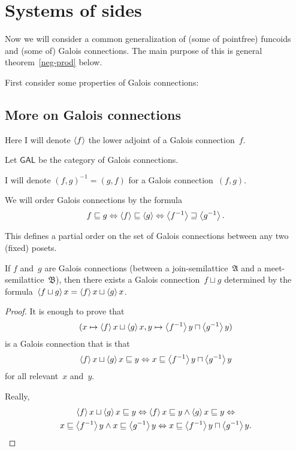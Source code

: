 \chapter{Systems of sides}

Now we will consider a common generalization of (some of pointfree) funcoids and (some of) Galois connections.
The main purpose of this is general theorem~\ref{neg-prod} below.

First consider some properties of Galois connections:

\section{More on Galois connections}

Here I will denote $\left\langle f\right\rangle$ the lower adjoint of a Galois connection~$f$. 

Let $\mathsf{GAL}$ be the category of Galois connections.

I will denote $(f,g)^{-1}=(g,f)$ for a Galois connection~$(f,g)$.

We will order Galois connections by the formula
\[ f\sqsubseteq g \Leftrightarrow \left\langle f\right\rangle\sqsubseteq\left\langle g\right\rangle \Leftrightarrow \left\langle f^{-1}\right\rangle\sqsupseteq\left\langle g^{-1}\right\rangle. \]

\begin{obvious}
This defines a partial order on the set of Galois connections between any two (fixed) posets.
\end{obvious}

\begin{prop}\label{gal-fjoin-x}
If $f$ and~$g$ are Galois connections (between a join-semilattice~$\mathfrak{A}$ and a meet-semilattice~$\mathfrak{B}$),
then there exists a Galois connection~$f\sqcup g$
determined by the formula~$\left\langle f\sqcup g\right\rangle x = \left\langle f\right\rangle x\sqcup\left\langle g\right\rangle x$.
\end{prop}

\begin{proof}
It is enough to prove that
\[ (x\mapsto\left\langle f\right\rangle x\sqcup\left\langle g\right\rangle x, y\mapsto\left\langle f^{-1}\right\rangle y\sqcap\left\langle g^{-1}\right\rangle y) \]
is a Galois connection that is that
\[ \left\langle f\right\rangle x\sqcup\left\langle g\right\rangle x\sqsubseteq y\Leftrightarrow x\sqsubseteq\left\langle f^{-1}\right\rangle y\sqcap\left\langle g^{-1}\right\rangle y \] for all relevant~$x$ and~$y$.

Really,
\begin{multline*}
\left\langle f\right\rangle x\sqcup\left\langle g\right\rangle x\sqsubseteq y \Leftrightarrow
\left\langle f\right\rangle x\sqsubseteq y\land\left\langle g\right\rangle x\sqsubseteq y \Leftrightarrow \\
x\sqsubseteq\left\langle f^{-1}\right\rangle y\land x\sqsubseteq\left\langle g^{-1}\right\rangle y \Leftrightarrow
x\sqsubseteq\left\langle f^{-1}\right\rangle y\sqcap\left\langle g^{-1}\right\rangle y.
\end{multline*}
\end{proof}

